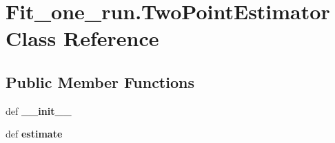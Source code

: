 \hypertarget{classFit__one__run_1_1TwoPointEstimator}{\section{\-Fit\-\_\-one\-\_\-run.\-Two\-Point\-Estimator \-Class \-Reference}
\label{classFit__one__run_1_1TwoPointEstimator}
}
\subsection*{\-Public \-Member \-Functions}
\begin{DoxyCompactItemize}
\item 
\hypertarget{classFit__one__run_1_1TwoPointEstimator_aff13b1525a0b59ba050a81c0c443c94d}{def {\bfseries \-\_\-\-\_\-init\-\_\-\-\_\-}}\label{classFit__one__run_1_1TwoPointEstimator_aff13b1525a0b59ba050a81c0c443c94d}

\item 
\hypertarget{classFit__one__run_1_1TwoPointEstimator_a5f9a818ca3b95720ca35bad0de1943bf}{def {\bfseries estimate}}\label{classFit__one__run_1_1TwoPointEstimator_a5f9a818ca3b95720ca35bad0de1943bf}

\end{DoxyCompactItemize}

